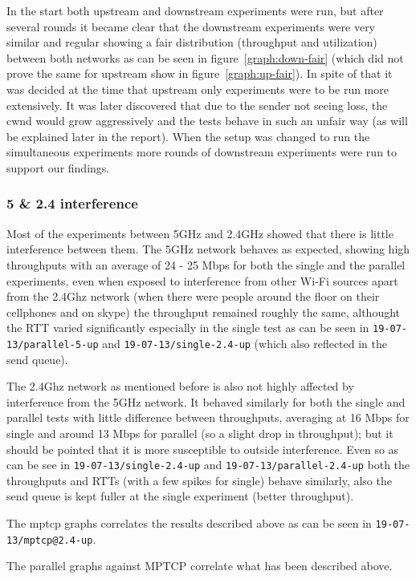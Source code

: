 In the start both upstream and downstream experiments were run, but after
several rounds it became clear that the downstream experiments were very similar
and regular showing a fair distribution (throughput and utilization) between
both networks as can be seen in figure~\ref{graph:down-fair} (which did not
prove the same for upstream show in figure~\ref{graph:up-fair}). In spite of
that it was decided at the time that upstream only experiments were to be run
more extensively. It was later discovered that due to the sender not seeing
loss, the cwnd would grow aggressively and the tests behave in such an unfair
way (as will be explained later in the report). When the setup was changed to
run the simultaneous experiments more rounds of downstream experiments were run
to support our findings.

\subsubsection{5 \& 2.4 interference}
Most of the experiments between 5GHz and 2.4GHz showed that there is little
interference between them. The 5GHz network behaves as expected, showing high
throughputs with an average of 24 - 25 Mbps  for both the single and the
parallel experiments, even when exposed to interference from other Wi-Fi sources
apart from the 2.4Ghz network (when there were people around the floor on their
cellphones and on skype) the throughput remained roughly the same, althought the
RTT varied significantly especially in the single test as can be seen in
\texttt{19-07-13/parallel-5-up} and \texttt{19-07-13/single-2.4-up} (which also
reflected in the send queue).

The 2.4Ghz network as mentioned before is also not highly affected by
interference from the 5GHz network. It behaved similarly for both the single and
parallel tests with little difference between throughputs, averaging at 16 Mbps
for single and around 13 Mbps for parallel (so a slight drop in throughput); but
it should be pointed that it is more susceptible to outside interference. Even
so as can be see in \texttt{19-07-13/single-2.4-up} and
\texttt{19-07-13/parallel-2.4-up} both the throughputs and RTTs (with a few
spikes for single) behave similarly, also the send queue is kept fuller at the
single experiment (better throughput).

The mptcp graphs correlates the results described above as can be seen in
\texttt{19-07-13/mptcp@2.4-up}.

The parallel graphs against MPTCP correlate what has been described above.


